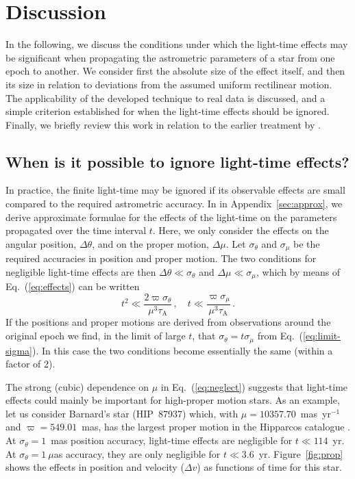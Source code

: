 \documentclass{aa}
\begin{document}
\section{Discussion}\label{s:discussion}

In the following, we discuss the conditions under which the light-time effects
may be significant when propagating the astrometric parameters of a star
from one epoch to another. We consider first the absolute size of the effect
itself, and then its size in relation to deviations from the assumed uniform
rectilinear motion. The applicability of the developed technique to real data
is discussed, and a simple criterion established for when the light-time effects
should be ignored. Finally, we briefly review this work in relation to the earlier
treatment by \citet{stumpff1985}.


\subsection{When is it possible to ignore light-time effects?}\label{ss:possible-to-ignore}

In practice, the finite light-time may be ignored if its observable effects are small
compared to the required astrometric accuracy. In in Appendix~\ref{sec:approx}, we
derive approximate formulae for the effects of the light-time on the parameters
propagated over the time interval $t$. Here, we only consider the effects on the
angular position, $\Delta\theta$, and on the proper motion, $\Delta\mu$.
Let $\sigma_\theta$ and $\sigma_\mu$
be the required accuracies in position and proper motion. The two conditions
for negligible light-time effects are then $\Delta\theta\ll\sigma_\theta$ and
$\Delta\mu\ll\sigma_\mu$, which by means of Eq.~(\ref{eq:effects}) can be
written
\begin{equation}\label{eq:neglect}
  t^2\ll\frac{2\varpi\sigma_\theta}{\mu^3\tau_\mathrm{A}} \, ,
  \quad
  t\ll\frac{\varpi\sigma_\mu}{\mu^3\tau_\mathrm{A}}\,.
\end{equation}
If the positions and proper motions are derived from observations
around the original epoch we find, in the limit of large $t$, that
$\sigma_\theta=t\sigma_\mu$ from Eq.~(\ref{eq:limit-sigma}).
In this case the two conditions become essentially the same (within a
factor of 2).

The strong (cubic) dependence on $\mu$ in Eq.~(\ref{eq:neglect}) suggests
that light-time effects could mainly be important for high-proper motion stars.
As an example, let us consider Barnard's star (HIP~87937) which, with
$\mu=10357.70$~mas~yr$^{-1}$ and $\varpi=549.01$~mas, has the
largest proper motion in the Hipparcos catalogue \citep{esa1997}.
At $\sigma_\theta=1$~mas position accuracy, light-time effects are negligible
for $t\ll 114$~yr. At $\sigma_\theta=1~\mu$as accuracy, they
are only negligible for $t\ll 3.6$~yr. Figure~\ref{fig:prop} shows the effects
in position and velocity ($\Delta v$) as functions of time for this star.
\end{document}
